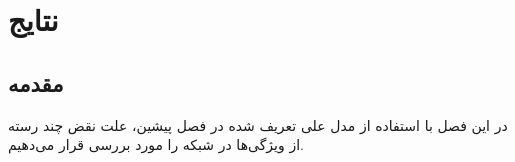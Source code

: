 \chapter{نتایج}
\section{مقدمه}
در این فصل با استفاده از مدل علی تعریف شده در فصل پیشین، علت نقض چند رسته از ویژگی‌ها در شبکه را مورد بررسی قرار می‌دهیم.


